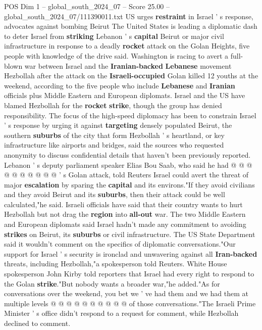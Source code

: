 \begin{textsample}{POS Dim 1 – global\_south\_2024\_07 – Score 25.00 – global\_south\_2024\_07/111390011.txt}  \label{ex:f1_pos_066}
US urges \textbf{restraint} in Israel ' s response, advocates against bombing Beirut The United States is leading a diplomatic dash to deter Israel from \textbf{striking} Lebanon ' s \textbf{capital} Beirut or major civil infrastructure in response to a deadly \textbf{rocket} attack on the Golan Heights, five people with knowledge of the drive said.
Washington is racing to avert a full-blown war between Israel and the \textbf{Iranian-backed} \textbf{Lebanese} movement Hezbollah after the attack on the \textbf{Israeli-occupied} Golan killed 12 youths at the weekend, according to the five people who include \textbf{Lebanese} and \textbf{Iranian} officials plus Middle Eastern and European diplomats.
Israel and the US have blamed Hezbollah for the \textbf{rocket} \textbf{strike}, though the group has denied responsibility.
The focus of the high-speed diplomacy has been to constrain Israel ' s response by urging it against \textbf{targeting} densely populated Beirut, the southern \textbf{suburbs} of the city that form Hezbollah ' s heartland, or key infrastructure like airports and bridges, said the sources who requested anonymity to discuss confidential details that haven't been previously reported.
Lebanon ' s deputy parliament speaker Elias Bou Saab, who said he had @ @ @ @ @ @ @ @ @ @ ' s Golan attack, told Reuters Israel could avert the threat of major \textbf{escalation} by sparing the \textbf{capital} and its environs."If they avoid civilians and they avoid Beirut and its \textbf{suburbs}, then their attack could be well calculated,"he said.
Israeli officials have said that their country wants to hurt Hezbollah but not drag the \textbf{region} into \textbf{all-out} war.
The two Middle Eastern and European diplomats said Israel hadn't made any commitment to avoiding \textbf{strikes} on Beirut, its \textbf{suburbs} or civil infrastructure.
The US State Department said it wouldn't comment on the specifics of diplomatic conversations."Our support for Israel ' s security is ironclad and unwavering against all \textbf{Iran-backed} threats, including Hezbollah,"a spokesperson told Reuters.
White House spokesperson John Kirby told reporters that Israel had every right to respond to the Golan \textbf{strike}."But nobody wants a broader war,"he added."As for conversations over the weekend, you bet we ' ve had them and we had them at multiple levels @ @ @ @ @ @ @ @ @ @ of those conversations."The Israeli Prime Minister ' s office didn't respond to a request for comment, while Hezbollah declined to comment.

\end{textsample}
